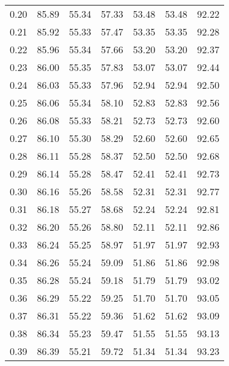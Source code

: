 \begin{tabular}{|c|c|c|c|c|c|c|}
      0.20 &     85.89 &     55.34 &      57.33 &   53.48 &      53.48 &         92.22 \\
      0.21 &     85.92 &     55.33 &      57.47 &   53.35 &      53.35 &         92.28 \\
      0.22 &     85.96 &     55.34 &      57.66 &   53.20 &      53.20 &         92.37 \\
      0.23 &     86.00 &     55.35 &      57.83 &   53.07 &      53.07 &         92.44 \\
      0.24 &     86.03 &     55.33 &      57.96 &   52.94 &      52.94 &         92.50 \\
      0.25 &     86.06 &     55.34 &      58.10 &   52.83 &      52.83 &         92.56 \\
      0.26 &     86.08 &     55.33 &      58.21 &   52.73 &      52.73 &         92.60 \\
      0.27 &     86.10 &     55.30 &      58.29 &   52.60 &      52.60 &         92.65 \\
      0.28 &     86.11 &     55.28 &      58.37 &   52.50 &      52.50 &         92.68 \\
      0.29 &     86.14 &     55.28 &      58.47 &   52.41 &      52.41 &         92.73 \\
      0.30 &     86.16 &     55.26 &      58.58 &   52.31 &      52.31 &         92.77 \\
      0.31 &     86.18 &     55.27 &      58.68 &   52.24 &      52.24 &         92.81 \\
      0.32 &     86.20 &     55.26 &      58.80 &   52.11 &      52.11 &         92.86 \\
      0.33 &     86.24 &     55.25 &      58.97 &   51.97 &      51.97 &         92.93 \\
      0.34 &     86.26 &     55.24 &      59.09 &   51.86 &      51.86 &         92.98 \\
      0.35 &     86.28 &     55.24 &      59.18 &   51.79 &      51.79 &         93.02 \\
      0.36 &     86.29 &     55.22 &      59.25 &   51.70 &      51.70 &         93.05 \\
      0.37 &     86.31 &     55.22 &      59.36 &   51.62 &      51.62 &         93.09 \\
      0.38 &     86.34 &     55.23 &      59.47 &   51.55 &      51.55 &         93.13 \\
      0.39 &     86.39 &     55.21 &      59.72 &   51.34 &      51.34 &         93.23 \\

\end{tabular}
